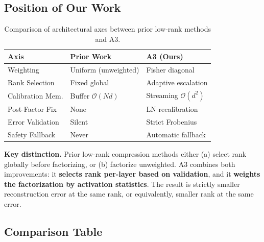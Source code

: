 \subsection{Position of Our Work}

\begin{table}[H]
\centering
\scriptsize
\setlength{\tabcolsep}{3pt}
\begin{tabular}{p{}p{}p{}}
\toprule
\textbf{Axis} & \textbf{Prior Work} & \textbf{A3 (Ours)} \\
\midrule
Weighting & Uniform (unweighted) & Fisher diagonal \\
Rank Selection & Fixed global & Adaptive escalation \\
Calibration Mem. & Buffer $\mathcal{O}(Nd)$ & Streaming $\mathcal{O}(d^2)$ \\
Post-Factor Fix & None & LN recalibration \\
Error Validation & Silent & Strict Frobenius \\
Safety Fallback & Never & Automatic fallback \\
\bottomrule
\end{tabular}
\caption{Comparison of architectural axes between prior low-rank methods and A3.}
\label{tab:positioning}
\end{table}

\textbf{Key distinction.} Prior low-rank compression methods either (a) select 
rank globally before factorizing, or (b) factorize unweighted. A3 combines 
both improvements: it \textbf{selects rank per-layer based on validation}, and it 
\textbf{weights the factorization by activation statistics}. The result is 
strictly smaller reconstruction error at the same rank, or equivalently, 
smaller rank at the same error.

\subsection{Comparison Table}

